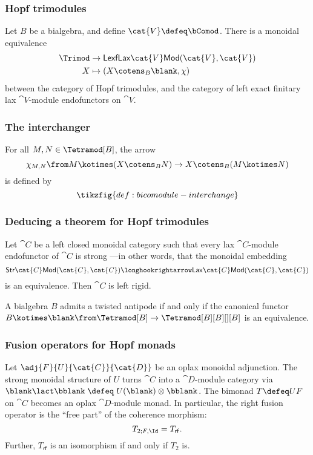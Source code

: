 \documentclass[aspectratio=169,12pt,professionalfont]{beamer}
\newcommand*{\bbcomod}[1][B]{\Tetramod[#1]}
\begin{document}
\begin{frame}\frametitle{Hopf trimodules}
  \begin{theorem}
    Let \(B\) be a bialgebra, and define \(\cat{V} \defeq \bComod\).
    \pause%
    There is a monoidal equivalence
    \begin{align*}
      \Trimod &\to \mathsf{LexfLax}\cat{V}\mathsf{Mod}(\cat{V}, \cat{V})\\
      X &\mapsto (X \cotens_B \blank, \chi)
    \end{align*}
    between the category of Hopf trimodules, and
    the category of left exact finitary lax \(\cat{V}\)\hyp{}module endofunctors on \(\cat{V}\).
  \end{theorem}
\end{frame}

\begin{frame}\frametitle{The interchanger}
  For all \(M, N \in \bbcomod\),
  the arrow
  \[
    \chi_{M, N} \from M \kotimes (X \cotens_B N) \to X \cotens_B (M \kotimes N)
  \]
  \pause%
  is defined by
  \[
    \tikzfig{def:bicomodule-interchange}
  \]
\end{frame}

\begin{frame}\frametitle{Deducing a theorem for Hopf trimodules}
  \begin{proposition*}
    Let \(\cat{C}\) be a left closed monoidal category such that every lax \(\cat{C}\)\hyp{}module endofunctor of \(\cat{C}\) is strong%
    —in other words, that the monoidal embedding
    \[
      \mathsf{Str}\cat{C}\mathsf{Mod}(\cat{C},\cat{C}) \longhookrightarrow \mathsf{Lax}\cat{C}\mathsf{Mod}(\cat{C},\cat{C})
    \]
    is an equivalence.
    Then \(\cat{C}\) is left rigid.
  \end{proposition*}
  \pause%
  \begin{corollary}
    A bialgebra \(B\) admits a twisted antipode if and only if the canonical functor
    \(B \kotimes \blank\from \Tetramod[B] \to \Tetramod[B][B][][B]\) is an equivalence.
  \end{corollary}
\end{frame}

\begin{frame}\frametitle{Fusion operators for Hopf monads}
  \begin{proposition*}
    Let \(\adj{F}{U}{\cat{C}}{\cat{D}}\) be an oplax monoidal adjunction.
    \pause%
    The strong monoidal structure of \(U\) turns \(\cat{C}\) into a \(\cat{D}\)\hyp{}module category via \(\blank \lact \bblank \;\defeq\; U(\blank) \otimes \bblank\).
    \pause%
    The bimonad \(T \defeq UF\) on \(\cat{C}\) becomes an oplax \(\cat{D}\)\hyp{}module monad.
    \pause%
    In particular, the right fusion operator is the ``free part'' of the coherence morphism:
    \[
      T_{2;F,\Id} = T_{\mathsf{rf}}.
    \]
    \pause%
    Further, \(T_{\mathsf{rf}}\) is an isomorphism if and only if \(T_2\) is.
  \end{proposition*}
\end{frame}
\end{document}
